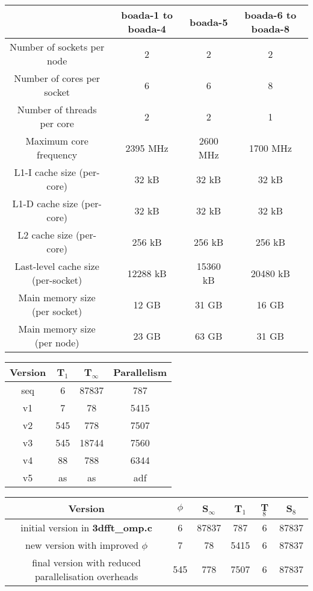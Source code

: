 \documentclass[12pt, a4paper]{article}
\begin{document}
\begin{center}
 \begin{tabular}{|c || c | c | c|} 
 \hline
   & boada-1 \textbf{to} boada-4 & boada-5 & boada-6 \textbf{to} boada-8 \\
 \hline
 Number of sockets per node & 2 & 2 & 2 \\ 
 \hline
 Number of cores per socket & 6 & 6 & 8 \\
 \hline
 Number of threads per core & 2 & 2 & 1 \\
 \hline
 Maximum core frequency & 2395 MHz & 2600 MHz & 1700 MHz \\
 \hline \hline
 L1-I cache size (per-core) & 32 kB & 32 kB & 32 kB \\ 
 \hline
 L1-D cache size (per-core) & 32 kB & 32 kB & 32 kB \\
 \hline
 L2 cache size (per-core) & 256 kB & 256 kB & 256 kB \\
 \hline
 Last-level cache size (per-socket) & 12288 kB & 15360 kB & 20480 kB \\
 \hline \hline
 Main memory size (per socket) & 12 GB & 31 GB & 16 GB \\
 \hline
 Main memory size (per node) & 23 GB & 63 GB & 31 GB \\
 \hline
\end{tabular}
\end{center}

\begin{center}
 \begin{tabular}{|c || c | c | c|} 
 \hline
 \textbf{Version} & T$_1$ & T$_\infty$ & \textbf{Parallelism} \\ 
 \hline\hline
 seq & 6 & 87837 & 787 \\ 
 \hline
 v1 & 7 & 78 & 5415 \\
 \hline
 v2 & 545 & 778 & 7507 \\
 \hline
 v3 & 545 & 18744 & 7560 \\
 \hline
 v4 & 88 & 788 & 6344 \\ 
 \hline
 v5 & as & as & adf \\
 \hline
\end{tabular}
\end{center}

\begin{center}
 \begin{tabular}{|c || c | c || c | c | c|} 
 \hline
 \textbf{Version} & $\phi$ & S$_\infty$ & T$_1$ & T$_8$ & S$_8$ \\
 \hline\hline
 initial version in \textbf{3dfft\_omp.c} & 6 & 87837 & 787 & 6 & 87837 \\ 
 \hline
 new version with improved $\phi$ & 7 & 78 & 5415 & 6 & 87837 \\
 \hline
 final version with reduced parallelisation overheads & 545 & 778 & 7507 & 6 & 87837 \\
 \hline
\end{tabular}
\end{center}
\end{document}
